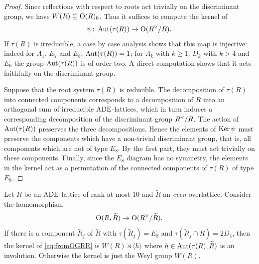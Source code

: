 \documentclass{amsart}
\numberwithin{procedure}{section}
\newcommand{\rl}{R}
\newcommand{\trl}{\widetilde{\rl}}
\newcommand{\arl}{\Aut(\tau(\rl))}
\renewcommand{\ker}{\Ker}
\begin{document}
%
\begin{proof}
 Since reflections with respect to roots act trivially on the discriminant group, we have $W(\rl) \subseteq \OG(\rl)_0$.
 Thus it suffices to compute the kernel of
 \[\psi\colon \arl \rightarrow \OG(\rl\dual /\rl).\]
 If $\tau(\rl)$ is irreducible, a case by case analysis shows that this map is injective: indeed
 for $A_1$, $E_7$ and $E_8$, $\arl=1$;
 for $A_k$ with $k \geq 1$, $D_k$ with $k>4$ and $E_6$ the group $\arl$ is of order two. 
 A direct computation shows that it acts faithfully on the discriminant group.
 \par
 Suppose that the root system $\tau(\rl)$ is reducible.
 The decomposition of $\tau(\rl)$ into connected components corresponds 
 to a decomposition of $\rl$ into an orthogonal sum of irreducible $\mathord{\rm ADE}$-lattices,
 which in turn induces a corresponding decomposition of the discriminant group $\rl\dual /\rl$. 
 The action of $\arl$ preserves the three decompositions.
 Hence the elements of $\ker \psi$ must preserve the components
 which have a non-trivial discriminant group, that is, all components which are not of type $E_8$.
 By the first part, they must act trivially on these components.
 Finally, since the $E_8$ diagram has no symmetry, 
 the elements in the kernel act as a permutation of the connected components of $\tau(\rl)$ of type $E_8$.
 \end{proof}
%
%
\begin{lemma}\label{lem:Gm}
 Let $\rl$ be  an $\mathord{\rm ADE}$-lattice of rank at most $10$ and
 $\trl$ an \emph{even} overlattice.
 Consider the homomorphism
 \begin{equation}\label{eq:fromOGRR}
 \OG(\rl,\trl) \rightarrow \OG(\rl\dual /\trl).
 \end{equation}
 If there is a component $\trl_j$ of $\trl$ with $\tau(\trl_j)=E_8$ and
 $\tau(\trl_j \cap \rl)=2D_4$, then the kernel of \eqref{eq:fromOGRR} is
 $W(\rl)\rtimes \langle h \rangle$ where $h \in \Aut(\tau(\rl),\trl)$
 is an involution.
 Otherwise the kernel is just the Weyl group $W(\rl)$.
 \end{lemma}
\end{document}
